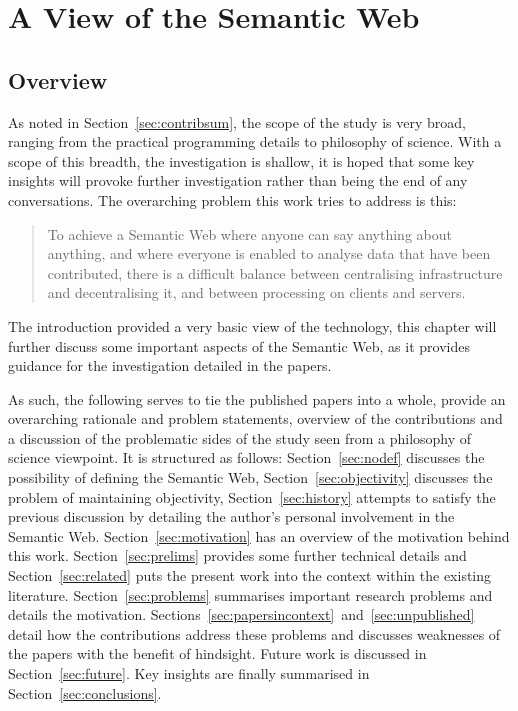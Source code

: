 \chapter{A View of the Semantic Web}

\section{Overview}\label{sec:introoverview}

As noted in Section~\ref{sec:contribsum}, the scope of the study is
very broad, ranging from the practical programming details to
philosophy of science. With a scope of this breadth, the investigation
is shallow, it is hoped that some key insights will provoke further
investigation rather than being the end of any conversations. 
The overarching problem this work tries to address is this:

\begin{framed}
\begin{quote}
To achieve a Semantic Web where anyone can say anything about
anything, and where everyone is enabled to analyse data that have been
contributed, there is a difficult balance between centralising
infrastructure and decentralising it, and between processing on
clients and servers.
\end{quote}
\end{framed}

The introduction provided a very basic view of the technology, this
chapter will further discuss some important aspects of the Semantic
Web, as it provides guidance for the investigation detailed in the
papers. 

As such, the following serves to tie the published papers into a
whole, provide an overarching rationale and problem statements,
overview of the contributions and a discussion of the problematic
sides of the study seen from a philosophy of science viewpoint. It is
structured as follows: Section~\ref{sec:nodef} discusses the
possibility of defining the Semantic Web,
Section~\ref{sec:objectivity} discusses the problem of maintaining
objectivity, Section~\ref{sec:history} attempts to satisfy the
previous discussion by detailing the author's personal involvement in
the Semantic Web. Section~\ref{sec:motivation} has an overview of the
motivation behind this work.  Section~\ref{sec:prelims} provides some
further technical details and Section~\ref{sec:related} puts the
present work into the context within the existing
literature. Section~\ref{sec:problems} summarises important research
problems and details the motivation.
Sections~\ref{sec:papersincontext}~and~\ref{sec:unpublished} detail
how the contributions address these problems and discusses weaknesses
of the papers with the benefit of hindsight. Future work is discussed
in Section~\ref{sec:future}. Key insights are finally summarised in
Section~\ref{sec:conclusions}.


